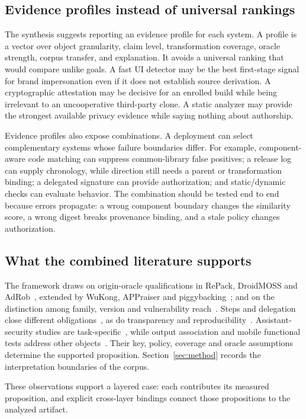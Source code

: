 \subsection{Evidence profiles instead of universal rankings}

The synthesis suggests reporting an evidence profile for each system. A profile is a vector over object granularity, claim level, transformation coverage, oracle strength, corpus transfer, and explanation. It avoids a universal ranking that would compare unlike goals. A fast UI detector may be the best first-stage signal for brand impersonation even if it does not establish source derivation. A cryptographic attestation may be decisive for an enrolled build while being irrelevant to an uncooperative third-party clone. A static analyzer may provide the strongest available privacy evidence while saying nothing about authorship.

Evidence profiles also expose combinations. A deployment can select complementary systems whose failure boundaries differ. For example, component-aware code matching can suppress common-library false positives; a release log can supply chronology, while direction still needs a parent or transformation binding; a delegated signature can provide authorization; and static/dynamic checks can evaluate behavior. The combination should be tested end to end because errors propagate: a wrong component boundary changes the similarity score, a wrong digest breaks provenance binding, and a stale policy changes authorization.

\subsection{What the combined literature supports}

The framework draws on origin-oracle qualifications in RePack, DroidMOSS and AdRob~\cite{repack,droidmoss,adrob}, extended by WuKong, APPraiser and piggybacking~\cite{wukong,appraiser,piggybacking}; and on the distinction among family, version and vulnerability reach~\cite{libid,originsvuln,tpl}. Steps and delegation close different obligations~\cite{tuf,intoto,diplomat}, as do transparency and reproducibility~\cite{chainiac,contour,reprocontainers}. Assistant-security studies are task-specific~\cite{pearce,perry,sandoval}, while output association and mobile functional tests address other objects~\cite{codexleaks,appforge}. Their key, policy, coverage and oracle assumptions determine the supported proposition. Section~\ref{sec:method} records the interpretation boundaries of the corpus.

These observations support a layered case: each contributes its measured proposition, and explicit cross-layer bindings connect those propositions to the analyzed artifact.
